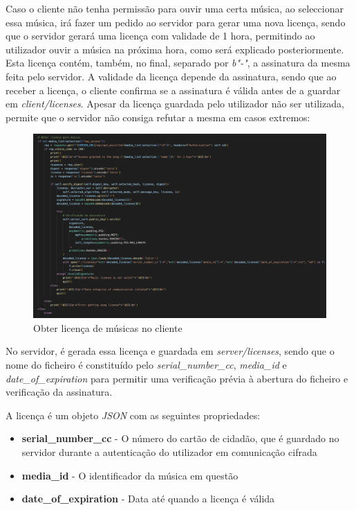 \documentclass[10pt,english]{article}
\begin{document}
\par Caso o cliente não tenha permissão para ouvir uma certa música, ao seleccionar essa música, irá fazer um pedido ao servidor para gerar uma nova licença, sendo que o servidor gerará uma licença com validade de 1 hora, permitindo ao utilizador ouvir a música na próxima hora, como será explicado posteriormente. Esta licença contém, também, no final, separado por \textit{b"-"}, a assinatura da mesma feita pelo servidor. A validade da licença depende da assinatura, sendo que ao receber a licença, o cliente confirma se a assinatura é válida antes de a guardar em \textit{client/licenses}. Apesar da licença guardada pelo utilizador não ser utilizada, permite que o servidor não consiga refutar a mesma em casos extremos:

\begin{figure}[!h]
        \centering
        \includegraphics[width=\textwidth]{images/get_license_client.png}
        \caption{Obter licença de músicas no cliente}
\end{figure}

\par No servidor, é gerada essa licença e guardada em \textit{server/licenses}, sendo que o nome do ficheiro é constituído pelo \textit{serial\_number\_cc}, \textit{media\_id} e \textit{date\_of\_expiration} para permitir uma verificação prévia à abertura do ficheiro e verificação da assinatura.

\par A licença é um objeto \textit{JSON} com as seguintes propriedades:

\begin{itemize}
    \item \textbf{serial\_number\_cc} - O número do cartão de cidadão, que é guardado no servidor durante a autenticação do utilizador em comunicação cifrada
    \item \textbf{media\_id} - O identificador da música em questão
    \item \textbf{date\_of\_expiration} - Data até quando a licença é válida
\end{itemize}
\end{document}
